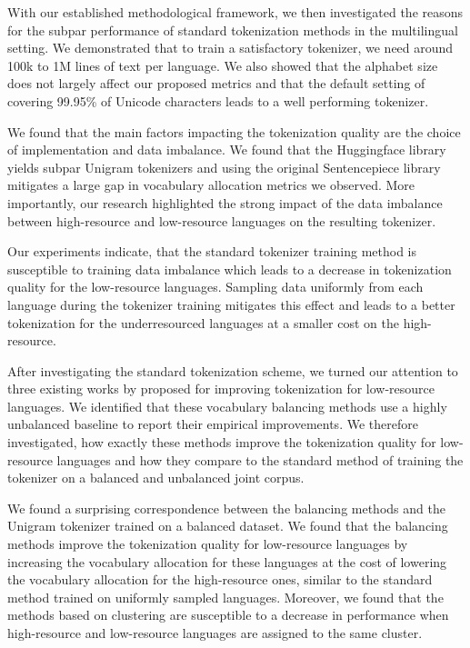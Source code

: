 
With our established methodological framework, we then investigated the reasons for the subpar performance of standard tokenization methods in the multilingual setting. We demonstrated that to train a satisfactory tokenizer, we need around 100k to 1M lines of text per language. We also showed that the alphabet size does not largely affect our proposed metrics and that the default setting of covering 99.95\% of Unicode characters leads to a well performing tokenizer. 

We found that the main factors impacting the tokenization quality are the choice of implementation and data imbalance. We found that the Huggingface library yields subpar Unigram tokenizers and using the original Sentencepiece library mitigates a large gap in vocabulary allocation metrics we observed. More importantly, our research highlighted the strong impact of the data imbalance between high-resource and low-resource languages on the resulting tokenizer. 

Our experiments indicate, that the standard tokenizer training method is susceptible to training data imbalance which leads to a decrease in tokenization quality for the low-resource languages. Sampling data uniformly from each language during the tokenizer training mitigates this effect and leads to a better tokenization for the underresourced languages at a smaller cost on the high-resource.

After investigating the standard tokenization scheme, we turned our attention to three existing works by \citet{chung_improving_2020,zheng_allocating_2021,liang_xlm-v_2023} proposed for improving tokenization for low-resource languages. We identified that these vocabulary balancing methods use a highly unbalanced baseline to report their empirical improvements. We therefore investigated, how exactly these methods improve the tokenization quality for low-resource languages and how they compare to the standard method of training the tokenizer on a balanced and unbalanced joint corpus.

We found a surprising correspondence between the balancing methods and the Unigram tokenizer trained on a balanced dataset. We found that the balancing methods improve the tokenization quality for low-resource languages by increasing the vocabulary allocation for these languages at the cost of lowering the vocabulary allocation for the high-resource ones, similar to the standard method trained on uniformly sampled languages. Moreover, we found that the methods based on clustering are susceptible to a decrease in performance when high-resource and low-resource languages are assigned to the same cluster.

